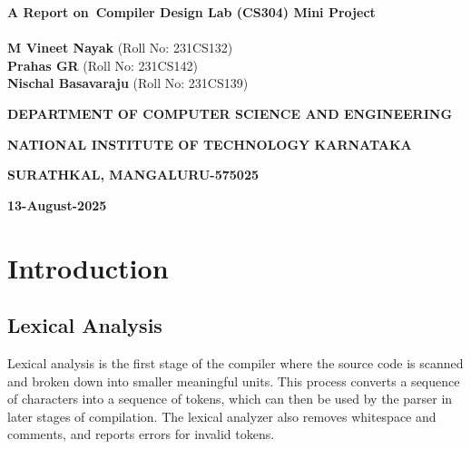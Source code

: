 \documentclass[12pt]{article}
\begin{document}
\begin{titlepage}
\begin{center}
{\fontsize{22}{26.4}\textbf{A Report on\ Compiler Design Lab (CS304) Mini Project}}\\
\textbf{}\\
{\textbf{M Vineet Nayak}} (Roll No: 231CS132)\\
\vspace{0.5cm}
{\textbf{Prahas GR}} (Roll No: 231CS142)\\
\vspace{0.5cm}
{\textbf{Nischal Basavaraju}} (Roll No: 231CS139)\\
\vspace{0.3cm}
\begin{figure}[h]
{\par}
\end{figure}
{\textbf{DEPARTMENT OF COMPUTER SCIENCE AND ENGINEERING}\par}
\vspace{-12pt}
{\textbf{NATIONAL INSTITUTE OF TECHNOLOGY KARNATAKA}\par}
\vspace{-12pt}
{\textbf{SURATHKAL, MANGALURU-575025}\par}
\vspace{-12pt}
{\textbf{13-August-2025}\par}
\end{center}
\pagebreak
\end{titlepage}



\tableofcontents
\newpage










\section{Introduction} 
\subsection{Lexical Analysis}
Lexical analysis is the first stage of the compiler where the source code is scanned and broken down into smaller meaningful units. This process converts a sequence of characters into a sequence of tokens, which can then be used by the parser in later stages of compilation. The lexical analyzer also removes whitespace and comments, and reports errors for invalid tokens.
\end{document}

